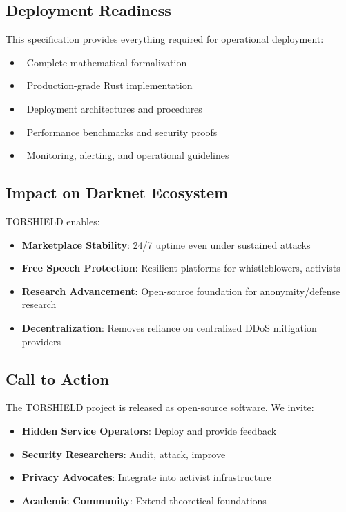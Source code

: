 \documentclass[11pt,a4paper]{article}
\begin{document}
\subsection{Deployment Readiness}

This specification provides everything required for operational deployment:
\begin{itemize}
\item \checkmark\ Complete mathematical formalization
\item \checkmark\ Production-grade Rust implementation
\item \checkmark\ Deployment architectures and procedures
\item \checkmark\ Performance benchmarks and security proofs
\item \checkmark\ Monitoring, alerting, and operational guidelines
\end{itemize}

\subsection{Impact on Darknet Ecosystem}

TORSHIELD enables:
\begin{itemize}
\item \textbf{Marketplace Stability}: 24/7 uptime even under sustained attacks
\item \textbf{Free Speech Protection}: Resilient platforms for whistleblowers, activists
\item \textbf{Research Advancement}: Open-source foundation for anonymity/defense research
\item \textbf{Decentralization}: Removes reliance on centralized DDoS mitigation providers
\end{itemize}

\subsection{Call to Action}

The TORSHIELD project is released as open-source software. We invite:
\begin{itemize}
\item \textbf{Hidden Service Operators}: Deploy and provide feedback
\item \textbf{Security Researchers}: Audit, attack, improve
\item \textbf{Privacy Advocates}: Integrate into activist infrastructure
\item \textbf{Academic Community}: Extend theoretical foundations
\end{itemize}
\end{document}
